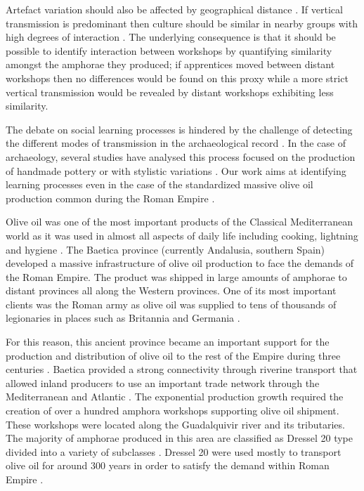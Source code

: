 \documentclass[review]{elsarticle}
\begin{document}
Artefact variation should also be affected by geographical distance \citep{bjorklund_effect_2010,shennan_isolation-by-distance_2015, van_strien_isolation-by-distance_2015}. If vertical transmission is predominant then culture should be similar in nearby groups with high degrees of interaction \citep{hart_effects_2012}. The underlying consequence is that it should be possible to identify interaction between workshops by quantifying similarity amongst the amphorae they produced; if apprentices moved between distant workshops then no differences would be found on this proxy while a more strict vertical transmission would be revealed by distant workshops exhibiting less similarity.


The debate on social learning processes is hindered by the challenge of detecting the different modes of transmission in the archaeological record \citep{roux_standardization_2015}. In the case of archaeology, several studies have analysed this process focused on the production of handmade pottery \citep{steele_james_ceramic_2010} or with stylistic variations \citep{neiman_stylistic_1995, shennan_ceramic_2001}. Our work aims at identifying learning processes even in the case of the standardized massive olive oil production common during the Roman Empire \citep{gandon_copying_2014,bevan_mediterranean_2014}. 

Olive oil was one of the most important products of the Classical Mediterranean world as it was used in almost all aspects of daily life including cooking, lightning and hygiene \citep{mattingly_d.j._oil_1988}. The Baetica province (currently Andalusia, southern Spain) developed a massive infrastructure of olive oil production to face the demands of the Roman Empire. The product was shipped in large amounts of amphorae to distant provinces all along the Western provinces. One of its most important clients was the Roman army as olive oil was supplied to tens of thousands of legionaries in places such as Britannia \citep{funari_economic_2005, monfort_britannia_1998} and Germania \citep{remesal_annona_1986}. 

For this reason, this ancient province became an important support for the production and distribution of olive oil to the rest of the Empire during three centuries \citep{chic2005comercio, millet_anforas_1998, rodriguez_baetican_1998}. Baetica provided a strong connectivity through riverine transport that allowed inland producers to use an important trade network through the Mediterranean and Atlantic \citep{garcia_vargas_enrique_formal_2010}. The exponential production growth required the creation of over a hundred amphora workshops supporting olive oil shipment. These workshops were located along the Guadalquivir river and its tributaries. The majority of amphorae produced in this area are classified as Dressel 20 type divided into a variety of subclasses \citep{berni_millet_epigrafianforica_2008, martin-kilcher_romischen_1994}. Dressel 20 were used mostly to transport olive oil for around 300 years in order to satisfy the demand within Roman Empire \citep{rodriguez_economioleicola_1977}. 
\end{document}
